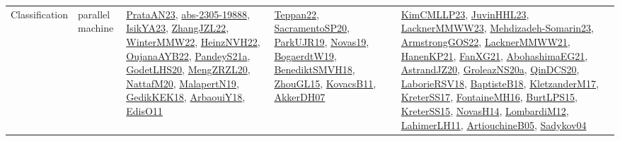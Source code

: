 {\begin{longtable}{lp{3cm}>{\raggedright}p{6cm}>{\raggedright}p{6cm}p{8cm}}
Classification & parallel machine & \href{articles/PrataAN23.pdf}{PrataAN23}\cite{PrataAN23}, \href{articles/abs-2305-19888.pdf}{abs-2305-19888}\cite{abs-2305-19888}, \href{articles/IsikYA23.pdf}{IsikYA23}\cite{IsikYA23}, \href{papers/ZhangJZL22.pdf}{ZhangJZL22}\cite{ZhangJZL22}, \href{papers/WinterMMW22.pdf}{WinterMMW22}\cite{WinterMMW22}, \href{articles/HeinzNVH22.pdf}{HeinzNVH22}\cite{HeinzNVH22}, \href{papers/OujanaAYB22.pdf}{OujanaAYB22}\cite{OujanaAYB22}, \href{articles/PandeyS21a.pdf}{PandeyS21a}\cite{PandeyS21a}, \href{papers/GodetLHS20.pdf}{GodetLHS20}\cite{GodetLHS20}, \href{articles/MengZRZL20.pdf}{MengZRZL20}\cite{MengZRZL20}, \href{papers/NattafM20.pdf}{NattafM20}\cite{NattafM20}, \href{papers/MalapertN19.pdf}{MalapertN19}\cite{MalapertN19}, \href{articles/GedikKEK18.pdf}{GedikKEK18}\cite{GedikKEK18}, \href{papers/ArbaouiY18.pdf}{ArbaouiY18}\cite{ArbaouiY18}, \href{papers/EdisO11.pdf}{EdisO11}\cite{EdisO11} & \href{papers/Teppan22.pdf}{Teppan22}\cite{Teppan22}, \href{articles/SacramentoSP20.pdf}{SacramentoSP20}\cite{SacramentoSP20}, \href{papers/ParkUJR19.pdf}{ParkUJR19}\cite{ParkUJR19}, \href{articles/Novas19.pdf}{Novas19}\cite{Novas19}, \href{papers/BogaerdtW19.pdf}{BogaerdtW19}\cite{BogaerdtW19}, \href{papers/BenediktSMVH18.pdf}{BenediktSMVH18}\cite{BenediktSMVH18}, \href{papers/ZhouGL15.pdf}{ZhouGL15}\cite{ZhouGL15}, \href{articles/KovacsB11.pdf}{KovacsB11}\cite{KovacsB11}, \href{papers/AkkerDH07.pdf}{AkkerDH07}\cite{AkkerDH07} & \href{papers/KimCMLLP23.pdf}{KimCMLLP23}\cite{KimCMLLP23}, \href{papers/JuvinHHL23.pdf}{JuvinHHL23}\cite{JuvinHHL23}, \href{articles/LacknerMMWW23.pdf}{LacknerMMWW23}\cite{LacknerMMWW23}, \href{papers/Mehdizadeh-Somarin23.pdf}{Mehdizadeh-Somarin23}\cite{Mehdizadeh-Somarin23}, \href{papers/ArmstrongGOS22.pdf}{ArmstrongGOS22}\cite{ArmstrongGOS22}, \href{papers/LacknerMMWW21.pdf}{LacknerMMWW21}\cite{LacknerMMWW21}, \href{papers/HanenKP21.pdf}{HanenKP21}\cite{HanenKP21}, \href{articles/FanXG21.pdf}{FanXG21}\cite{FanXG21}, \href{articles/AbohashimaEG21.pdf}{AbohashimaEG21}\cite{AbohashimaEG21}, \href{articles/AstrandJZ20.pdf}{AstrandJZ20}\cite{AstrandJZ20}, \href{papers/GroleazNS20a.pdf}{GroleazNS20a}\cite{GroleazNS20a}, \href{articles/QinDCS20.pdf}{QinDCS20}\cite{QinDCS20}, \href{articles/LaborieRSV18.pdf}{LaborieRSV18}\cite{LaborieRSV18}, \href{articles/BaptisteB18.pdf}{BaptisteB18}\cite{BaptisteB18}, \href{papers/KletzanderM17.pdf}{KletzanderM17}\cite{KletzanderM17}, \href{articles/KreterSS17.pdf}{KreterSS17}\cite{KreterSS17}, \href{papers/FontaineMH16.pdf}{FontaineMH16}\cite{FontaineMH16}, \href{papers/BurtLPS15.pdf}{BurtLPS15}\cite{BurtLPS15}, \href{papers/KreterSS15.pdf}{KreterSS15}\cite{KreterSS15}, \href{articles/NovasH14.pdf}{NovasH14}\cite{NovasH14}, \href{articles/LombardiM12.pdf}{LombardiM12}\cite{LombardiM12}, \href{papers/LahimerLH11.pdf}{LahimerLH11}\cite{LahimerLH11}, \href{papers/ArtiouchineB05.pdf}{ArtiouchineB05}\cite{ArtiouchineB05}, \href{papers/Sadykov04.pdf}{Sadykov04}\cite{Sadykov04}\\

\end{longtable}}
